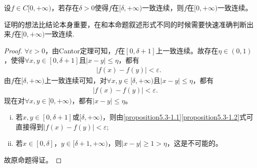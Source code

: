 \documentclass[../../main.tex]{subfiles}%
\begin{document}
\begin{proposition}[一致连续函数的拼接]\label{proposition:一致连续函数的拼接}
设\(f\in C[0,+\infty)\)，若存在\(\delta>0\)使得\(f\)在\([\delta,+\infty)\)一致连续，则\(f\)在\([0,+\infty)\)一致连续。
\end{proposition}
\begin{note}
证明的想法比结论本身重要，在和本命题叙述形式不同的时候需要快速准确判断出来\(f\)在\([0,+\infty)\)一致连续.
\end{note}
\begin{proof}

\(\forall \varepsilon >0\)，由Cantor定理可知，\(f\)在\([0,\delta + 1]\)上一致连续。故存在\(\eta \in (0,1)\)，使得\(\forall x,y\in [0,\delta + 1]\)且\(\vert x - y\vert\leqslant \eta\)，都有
\begin{align}
\vert f(x) - f(y)\vert<\varepsilon.\label{proposition5.3-1.1}
\end{align}
由\(f\)在\([\delta, +\infty)\)上一致连续可知，对\(\forall x,y\in [\delta, +\infty)\)且\(\vert x - y\vert\leqslant \eta\)，都有
\begin{align}
\vert f(x) - f(y)\vert<\varepsilon. \quad \label{proposition5.3-1.2} 
\end{align}
现在对\(\forall x,y\in [0, +\infty)\)，都有\(\vert x - y\vert\leqslant \eta\)。
\begin{enumerate}[(i)]
\item 若\(x,y\in [0,\delta + 1]\)或\([\delta, +\infty)\)，则由\eqref{proposition5.3-1.1}\eqref{proposition5.3-1.2}式可直接得到\(\vert f(x) - f(y)\vert<\varepsilon\);

\item 若\(x\in [0,\delta]\)，\(y\in [\delta+1, +\infty)\)，则\(\vert x - y\vert\geqslant 1>\eta\)，这是不可能的。
\end{enumerate}
故原命题得证。

\end{proof}
\end{document}
